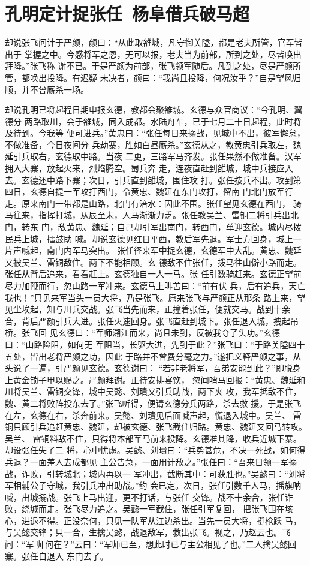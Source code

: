 \chapter{孔明定计捉张任~杨阜借兵破马超}

却说张飞问计于严颜，颜曰：“从此取雒城，凡守御关隘，都是老夫所管，官军皆出于
掌握之中。今感将军之恩，无可以报，老夫当为前部，所到之处，尽皆唤出拜降。”张飞称
谢不已。于是严颜为前部，张飞领军随后。凡到之处，尽是严颜所管，都唤出投降。有迟疑
未决者，颜曰：“我尚且投降，何况汝乎？”自是望风归顺，并不曾厮杀一场。

却说孔明已将起程日期申报玄德，教都会聚雒城。玄德与众官商议：“今孔明、翼德分
两路取川，会于雒城，同入成都。水陆舟车，已于七月二十日起程，此时将及待到。今我等
便可进兵。”黄忠曰：“张任每日来搦战，见城中不出，彼军懈怠，不做准备，今日夜间分
兵劫寨，胜如白昼厮杀。”玄德从之，教黄忠引兵取左，魏延引兵取右，玄德取中路。当夜
二更，三路军马齐发。张任果然不做准备。汉军拥入大寨，放起火来，烈焰腾空。蜀兵奔
走，连夜直赶到雒城，城中兵接应入去。玄德还中路下寨；次日，引兵直到雒城，围住攻
打。张任按兵不出。攻到第四日，玄德自提一军攻打西门，令黄忠、魏延在东门攻打，留南
门北门放军行走。原来南门一带都是山路，北门有涪水：因此不围。张任望见玄德在西门，
骑马往来，指挥打城，从辰至未，人马渐渐力乏。张任教吴兰、雷铜二将引兵出北门，转东
门，敌黄忠、魏延；自己却引军出南门，转西门，单迎玄德。城内尽拨民兵上城，擂鼓助
喊。却说玄德见红日平西，教后军先退。军士方回身，城上一片声喊起，南门内军马突出。
张任径来军中捉玄德，玄德军中大乱。黄忠、魏延又被吴兰、雷铜敌住。两下不能相顾。玄
德敌不住张任，拨马往山僻小路而走。张任从背后追来，看看赶上。玄德独自一人一马。张
任引数骑赶来。玄德正望前尽力加鞭而行，忽山路一军冲来。玄德马上叫苦曰：“前有伏
兵，后有追兵，天亡我也！”只见来军当头一员大将，乃是张飞。原来张飞与严颜正从那条
路上来，望见尘埃起，知与川兵交战。张飞当先而来，正撞着张任，便就交马。战到十余
合，背后严颜引兵大进。张任火速回身。张飞直赶到城下。张任退入城，拽起吊桥。张飞回
见玄德曰：“军师溯江而来，尚且未到，反被我夺了头功。”玄德曰：“山路险阻，如何无
军阻当，长驱大进，先到于此？”张飞曰：“于路关隘四十五处，皆出老将严颜之功，因此
于路并不曾费分毫之力。”遂把义释严颜之事，从头说了一遍，引严颜见玄德。玄德谢曰：
“若非老将军，吾弟安能到此？”即脱身上黄金锁子甲以赐之。严颜拜谢。正待安排宴饮，
忽闻哨马回报：“黄忠、魏延和川将吴兰、雷铜交锋，城中吴懿、刘璝又引兵助战，两下夹
攻，我军抵敌不住，魏、黄二将败阵投东去了。”张飞听得，便请玄德分兵两路，杀去救
援。于是张飞在左，玄德在右，杀奔前来。吴懿、刘璝见后面喊声起，慌退入城中。吴兰、
雷铜只顾引兵追赶黄忠、魏延，却被玄德、张飞截住归路。黄忠、魏延又回马转攻。吴兰、
雷铜料敌不住，只得将本部军马前来投降。玄德准其降，收兵近城下寨。却设张任失了二
将，心中忧虑。吴懿、刘璝曰：“兵势甚危，不决一死战，如何得兵退？一面差人去成都见
主公告急，一面用计敌之。”张任曰：“吾来日领一军搦战，诈败，引转城北；城内再以一
军冲出，截断其中：可获胜也。”吴懿曰：“刘将军相辅公子守城，我引兵冲出助战。”约
会已定。次日，张任引数千人马，摇旗呐喊，出城搦战。张飞上马出迎，更不打话，与张任
交锋。战不十余合，张任诈败，绕城而走。张飞尽力追之。吴懿一军截住，张任引军复回，
把张飞围在垓心，进退不得。正没奈何，只见一队军从江边杀出。当先一员大将，挺枪跃
马，与吴懿交锋；只一合，生擒吴懿，战退敌军，救出张飞。视之，乃赵云也。飞问：“军
师何在？”云曰：“军师已至，想此时已与主公相见了也。”二人擒吴懿回寨。张任自退入
东门去了。

